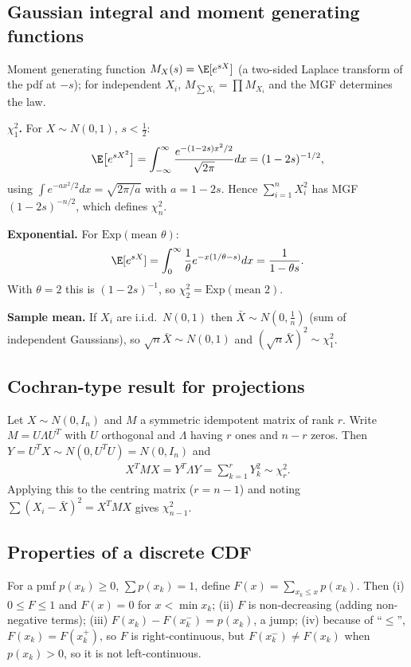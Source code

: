 \subsection{Gaussian integral and moment generating functions}
Moment generating function $M_X(s)=\E[e^{sX}]$ (a two-sided Laplace transform of the pdf at $-s$); for independent
$X_i$, $M_{\sum X_i}=\prod M_{X_i}$ and the MGF determines the law.

\textbf{$\chi^2_1$.} For $X\sim N(0,1)$, $s<\tfrac12$:
\begin{align}
\E\big[e^{sX^2}\big]=\int_{-\infty}^\infty\frac{e^{-(1-2s)x^2/2}}{\sqrt{2\pi}}dx=(1-2s)^{-1/2}, \label{eq:mgfchi}
\end{align}
using $\int e^{-ax^2/2}dx=\sqrt{2\pi/a}$ with $a=1-2s$. Hence $\sum_{i=1}^nX_i^2$ has MGF
$(1-2s)^{-n/2}$, which defines $\chi^2_n$.

\textbf{Exponential.} For $\text{Exp}(\text{mean }\theta)$:
\begin{align}
\E[e^{sX}]=\int_0^\infty\frac1\theta e^{-x(1/\theta-s)}dx=\frac1{1-\theta s}. \label{eq:mgfexp}
\end{align}
With $\theta=2$ this is $(1-2s)^{-1}$, so $\chi^2_2=\text{Exp}(\text{mean }2)$.

\textbf{Sample mean.} If $X_i$ are i.i.d.\ $N(0,1)$ then $\bar X\sim N(0,\tfrac1n)$ (sum of independent Gaussians),
so $\sqrt n\bar X\sim N(0,1)$ and $(\sqrt n\bar X)^2\sim\chi^2_1$.

\subsection{Cochran-type result for projections}
Let $X\sim N(0,I_n)$ and $M$ a symmetric idempotent matrix of rank $r$. Write $M=U\Lambda U^T$ with $U$
orthogonal and $\Lambda$ having $r$ ones and $n-r$ zeros. Then $Y=U^TX\sim N(0,U^TU)=N(0,I_n)$ and
\begin{align}
X^TMX=Y^T\Lambda Y=\sum_{k=1}^rY_k^2\sim\chi^2_r. \label{eq:cochran}
\end{align}
Applying this to the centring matrix ($r=n-1$) and noting $\sum(X_i-\bar X)^2=X^TMX$ gives $\chi^2_{n-1}$.

\subsection{Properties of a discrete CDF}
For a pmf $p(x_k)\ge0$, $\sum p(x_k)=1$, define $F(x)=\sum_{x_k\le x}p(x_k)$. Then
(i) $0\le F\le1$ and $F(x)=0$ for $x<\min x_k$; (ii) $F$ is non-decreasing (adding non-negative terms);
(iii) $F(x_k)-F(x_k^-)=p(x_k)$, a jump; (iv) because of ``$\le$'', $F(x_k)=F(x_k^+)$, so $F$ is right-continuous,
but $F(x_k^-)\ne F(x_k)$ when $p(x_k)>0$, so it is not left-continuous.

